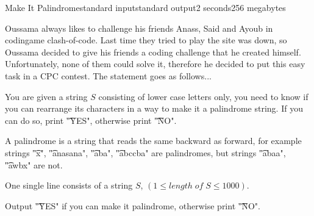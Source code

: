 \begin{problem}{Make It Palindrome}{standard input}{standard output}{2 seconds}{256 megabytes}

Oussama always likes to challenge his friends Anass, Said and Ayoub in codingame clash-of-code. Last time they tried to play the site was down, so Oussama decided to give his friends a coding challenge that he created himself. Unfortunately, none of them could solve it, therefore he decided to put this easy task in a CPC contest. The statement goes as follows...


You are given a string $S$ consisting of lower case letters only, you need to know if you can rearrange its characters in a way to make it a palindrome string. If you can do so, print \t{"YES"}, otherwise print \t{"NO"}.

A palindrome is a string that reads the same backward as forward, for example strings \t{"x"}, \t{"anasana"}, \t{"aba"}, \t{"abccba"} are palindromes, but strings \t{"abaa"}, \t{"awbx"} are not.

\InputFile
One single line consists of a string $S$, $(1 \leq length\; of \; S \leq 1000)$.

\OutputFile
Output \t{"YES"} if you can make it palindrome, otherwise print \t{"NO"}.

\Examples

\begin{example}
%
%
\end{example}

\end{problem}

